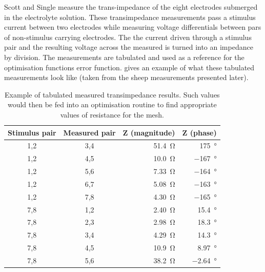     Scott and Single measure the trans-impedance of the eight electrodes submerged in the electrolyte solution.
    These transimpedance measurements pass a stimulus current between two electrodes while measuring voltage differentials between pars of non-stimulus carrying electrodes.
    The the current driven through a stimulus pair and the resulting voltage across the measured is turned into an impedance by division.
    The measurements are tabulated and used as a reference for the optimisation functions error function.
     gives an example of what these tabulated measurements look like (taken from the sheep measurements presented later).
    \begin{table}
      \begin{center}
        \begin{tabular} {c | c | r | r}
          Stimulus pair & Measured pair & Z (magnitude) & Z (phase)\\
          \hline
            1,2 & 3,4 & \SI{51.4}{\ohm} & \SI{175}{\degree}\\
            1,2 & 4,5 & \SI{10.0}{\ohm} & \SI{-167}{\degree}\\
            1,2 & 5,6 & \SI{7.33}{\ohm} & \SI{-164}{\degree}\\
            1,2 & 6,7 & \SI{5.08}{\ohm} & \SI{-163}{\degree}\\
            1,2 & 7,8 & \SI{4.30}{\ohm} & \SI{-165}{\degree}\\
          \hline
            7,8 & 1,2 & \SI{2.40}{\ohm} & \SI{15.4}{\degree}\\
            7,8 & 2,3 & \SI{2.98}{\ohm} & \SI{18.3}{\degree}\\
            7,8 & 3,4 & \SI{4.29}{\ohm} & \SI{14.3}{\degree}\\
            7,8 & 4,5 & \SI{10.9}{\ohm} & \SI{8.97}{\degree}\\
            7,8 & 5,6 & \SI{38.2}{\ohm} & \SI{-2.64}{\degree}
        \end{tabular}
      \end{center}
      \caption{\label{tab:pt2-transimpedance}Example of tabulated measured transimpedance results. Such values would then be fed into an optimisation routine to find appropriate values of resistance for the mesh.}
    \end{table}

